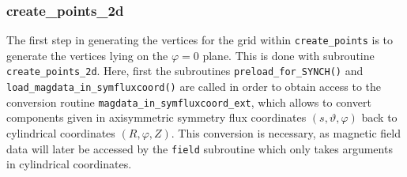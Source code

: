 \documentclass[./main.tex]{subfiles}
\begin{document}
\subsubsection{create\_points\_2d}
The first step in generating the vertices for the grid within \texttt{create\_points} is to generate the vertices lying on the $\varphi=0$ plane. This is done with subroutine \texttt{create\_points\_2d}. Here, first the subroutines \texttt{preload\_for\_SYNCH()} and \texttt{load\_magdata\_in\_symfluxcoord()} are called in order to obtain access to the conversion routine \texttt{magdata\_in\_symfluxcoord\_ext}, which allows to convert components given in axisymmetric symmetry flux coordinates $(s,\vartheta,\varphi)$ back to cylindrical coordinates $(R,\varphi,Z)$. This conversion is necessary, as magnetic field data will later be accessed by the \texttt{field} subroutine which only takes arguments in cylindrical coordinates. \\
\end{document}

